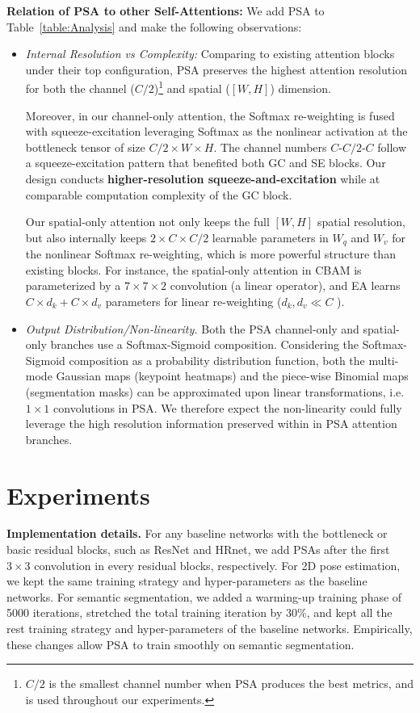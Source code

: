 \documentclass[10pt,twocolumn,letterpaper]{article}
\begin{document}
\textbf{Relation of PSA to other Self-Attentions:} We add PSA to Table~\ref{table:Analysis} and make the following observations: 
\begin{itemize}
    \item \textit{Internal Resolution vs Complexity:} Comparing to existing attention blocks under their top configuration, PSA preserves the highest attention resolution for both the channel ($C/2$)\footnote{$C/2$ is the smallest channel number when PSA produces the best metrics, and is used throughout our experiments.} and spatial ($[W, H]$) dimension. 
    
    Moreover, in our channel-only attention, the Softmax re-weighting is fused with squeeze-excitation leveraging Softmax as the nonlinear activation at the bottleneck tensor of size $C/2 \times W \times H$. The channel numbers $C$-$C/2$-$C$ follow a squeeze-excitation pattern that benefited both GC and SE blocks. Our design conducts \textbf{higher-resolution squeeze-and-excitation} while at comparable computation complexity of the GC block. 
    
    Our spatial-only attention not only keeps the full $[W,H]$ spatial resolution, but also internally keeps $2\times C \times C/2$ learnable parameters in $W_q$ and $W_v$ for the nonlinear Softmax re-weighting, which is more powerful structure than existing blocks. For instance, the spatial-only attention in CBAM is parameterized by a $7\times 7 \times 2$ convolution (a linear operator), and EA learns $ C \times d_{k}+ C \times d_{v}$ parameters for linear re-weighting ($d_{k}, d_{v} \ll C$ ). 

    \item \textit{Output Distribution/Non-linearity.} Both the PSA channel-only and spatial-only branches use a Softmax-Sigmoid composition. Considering the Softmax-Sigmoid composition as a probability distribution function, both the multi-mode Gaussian maps (keypoint heatmaps) and the piece-wise Binomial maps (segmentation masks) can be approximated upon linear transformations, i.e. $1\times 1$ convolutions in PSA. We therefore expect the non-linearity could fully leverage the high resolution information preserved within in PSA attention branches.
\end{itemize}
  




\section{Experiments}
\textbf{Implementation details.} For any baseline networks with the bottleneck or basic residual blocks, such as ResNet and HRnet, we add PSAs after the first $3\times3$ convolution in every residual blocks, respectively. For 2D pose estimation, we kept the same training strategy and hyper-parameters as the baseline networks. For semantic segmentation, we added a warming-up training phase of 5000 iterations, stretched the total training iteration by $30\%$, and kept all the rest training strategy and hyper-parameters of the baseline networks. Empirically, these changes allow PSA to train smoothly on semantic segmentation. 
\end{document}
